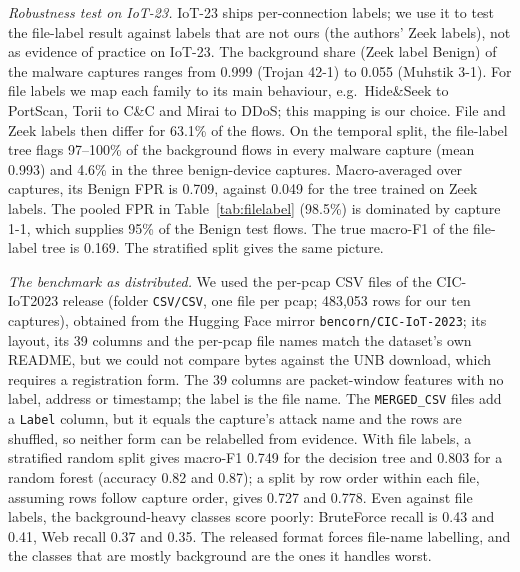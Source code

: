 \emph{Robustness test on IoT-23.} IoT-23 ships per-connection labels; we use it to test the file-label result against labels that are not ours (the authors' Zeek labels), not as evidence of practice on IoT-23. The background share (Zeek label Benign) of the malware captures ranges from 0.999 (Trojan 42-1) to 0.055 (Muhstik 3-1). For file labels we map each family to its main behaviour, e.g.\ Hide\&Seek to PortScan, Torii to C\&C and Mirai to DDoS; this mapping is our choice. File and Zeek labels then differ for 63.1\% of the flows. On the temporal split, the file-label tree flags 97--100\% of the background flows in every malware capture (mean 0.993) and 4.6\% in the three benign-device captures. Macro-averaged over captures, its Benign FPR is 0.709, against 0.049 for the tree trained on Zeek labels. The pooled FPR in Table~\ref{tab:filelabel} (98.5\%) is dominated by capture 1-1, which supplies 95\% of the Benign test flows. The true macro-F1 of the file-label tree is 0.169. The stratified split gives the same picture.

\emph{The benchmark as distributed.} We used the per-pcap CSV files of the CIC-IoT2023 release (folder \texttt{CSV/CSV}, one file per pcap; 483,053 rows for our ten captures), obtained from the Hugging Face mirror \texttt{bencorn/CIC-IoT-2023}; its layout, its 39 columns and the per-pcap file names match the dataset's own README, but we could not compare bytes against the UNB download, which requires a registration form. The 39 columns are packet-window features with no label, address or timestamp; the label is the file name. The \texttt{MERGED\_CSV} files add a \texttt{Label} column, but it equals the capture's attack name and the rows are shuffled, so neither form can be relabelled from evidence. With file labels, a stratified random split gives macro-F1 0.749 for the decision tree and 0.803 for a random forest (accuracy 0.82 and 0.87); a split by row order within each file, assuming rows follow capture order, gives 0.727 and 0.778. Even against file labels, the background-heavy classes score poorly: BruteForce recall is 0.43 and 0.41, Web recall 0.37 and 0.35. The released format forces file-name labelling, and the classes that are mostly background are the ones it handles worst.
